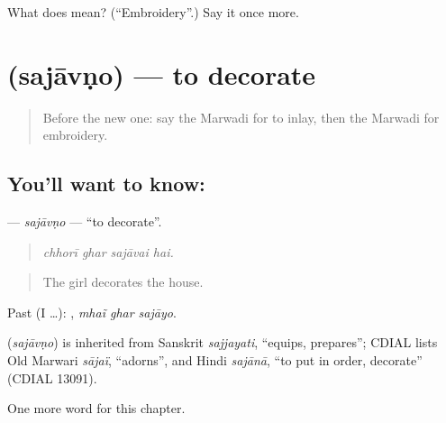 \begin{tcolorbox}[breakable,colback=teal!4,colframe=teal!35!black,title={Before you move on}]
What does  mean? (\textquotedblleft{}Embroidery\textquotedblright{}.) Say it once more.
\end{tcolorbox}
\section[\texorpdfstring{\mw{सजावणो} (sajāvṇo)}{सजावणो (sajāvṇo)}]{ (sajāvṇo) — to decorate}

\label{lesson:MW-C283-sajavno}



\begin{quote}
Before the new one: say the Marwadi for to inlay, then the Marwadi for embroidery.
\end{quote}

\subsection*{You'll want to know: }
\textbf{} — \emph{sajāvṇo} — \textquotedblleft{}to decorate\textquotedblright{}.

\begin{quote}
   
\end{quote}

\begin{quote}
\emph{chhorī ghar sajāvai hai.}
\end{quote}

\begin{quote}
The girl decorates the house.
\end{quote}

Past (I …):   , \emph{mhaĩ ghar sajāyo}.

\begin{cousinweb}
\textbf{} (\emph{sajāvṇo}) is inherited from Sanskrit \emph{sajjayati}, \textquotedblleft{}equips, prepares\textquotedblright{}; CDIAL lists Old Marwari \emph{sājaï}, \textquotedblleft{}adorns\textquotedblright{}, and Hindi \emph{sajānā}, \textquotedblleft{}to put in order, decorate\textquotedblright{} (CDIAL 13091).
\end{cousinweb}

\begin{grammarlens}[title={What you've built}]
One more word for this chapter.
\end{grammarlens}

